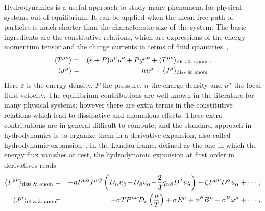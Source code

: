 \documentclass[a4paper]{jpconf}
\begin{document}
Hydrodynamics is a useful approach to study many phenomena for physical systems out of equilibrium. It can be applied when the mean free path of particles is much shorter than the characteristic size of the system. The basic ingredients are the constitutive relations, which are expressions of the energy-momentum tensor and the charge currents in terms of fluid quantities~\cite{kovtun:2012rj}, 
\begin{eqnarray}
\langle T^{\mu\nu} \rangle &=& (\varepsilon + P) u^\mu u^\nu  + P g^{\mu\nu} + \langle T^{\mu\nu} \rangle_{\textrm{\scriptsize diss \& anom}}   \,, \nonumber \\
\langle J^\mu \rangle &=& n u^\mu + \langle J^\mu \rangle_{\textrm{\scriptsize diss \& anom}}  \,. \nonumber
\end{eqnarray}
Here $\varepsilon$ is the energy density, $P$ the pressure, $n$ the charge density and $u^\mu$ the local fluid velocity. The equilibrium contributions are well known in the literature for many physical systems; however there are extra terms in the constitutive relations which lead to dissipative and anomalous effects. These extra contributions are in general difficult to compute, and the standard approach in hydrodynamics is to organize them in a derivative expansion, also called hydrodynamic expansion~\cite{Erdmenger:2008rm,Banerjee:2008th,Kharzeev:2011ds,Megias:2013joa}. In the Landau frame, defined as the one in which the energy flux vanishes at rest, the hydrodynamic expansion at first order in derivatives reads
\begin{eqnarray}
\langle T^{\mu\nu} \rangle_{\textrm{\scriptsize diss \& anom}} &=& - \eta P^{\mu\alpha}P^{\nu\beta} \left(D_\alpha u_\beta \!+\! D_\beta u_\alpha \!-\! \frac{2}{3}g_{\alpha\beta}D^\lambda u_\lambda\right) - \zeta P^{\mu\nu} D^\alpha u_\alpha + \cdots  \,, \label{eq:Tmunu} \\
\hspace{-0.9cm}\langle J^\mu \rangle_{\textrm{\scriptsize diss \& anom}}\!\!\!\! &=&\!\!\!\! -\sigma T P^{\mu\nu} D_\nu \left( \frac{\mu}{T} \right) + \sigma E^\mu + \sigma^\cB B^\mu + \sigma^\cV\omega^\mu + \cdots  \,, \label{eq:Jmu}
\end{eqnarray}
\end{document}
